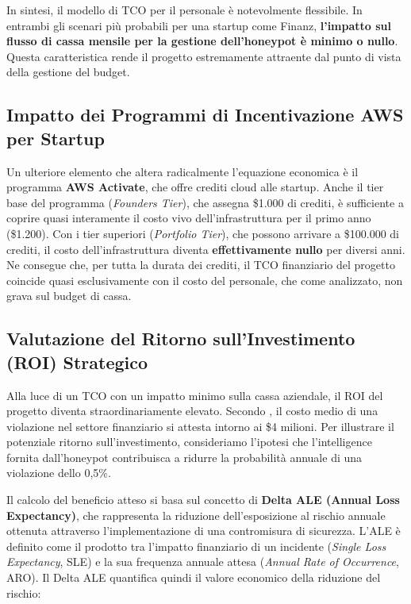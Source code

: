 In sintesi, il modello di TCO per il personale è notevolmente flessibile. In entrambi gli scenari più probabili per una startup come Finanz, \textbf{l'impatto sul flusso di cassa mensile per la gestione dell'honeypot è minimo o nullo}. Questa caratteristica rende il progetto estremamente attraente dal punto di vista della gestione del budget.

\subsection{Impatto dei Programmi di Incentivazione AWS per Startup}
Un ulteriore elemento che altera radicalmente l'equazione economica è il programma \textbf{AWS Activate}, che offre crediti cloud alle startup. Anche il tier base del programma (\textit{Founders Tier}), che assegna \$1.000 di crediti, è sufficiente a coprire quasi interamente il costo vivo dell'infrastruttura per il primo anno (\$1.200). Con i tier superiori (\textit{Portfolio Tier}), che possono arrivare a \$100.000 di crediti, il costo dell'infrastruttura diventa \textbf{effettivamente nullo} per diversi anni.
Ne consegue che, per tutta la durata dei crediti, il TCO finanziario del progetto coincide quasi esclusivamente con il costo del personale, che come analizzato, non grava sul budget di cassa.

\subsection{Valutazione del Ritorno sull'Investimento (ROI) Strategico}
Alla luce di un TCO con un impatto minimo sulla cassa aziendale, il ROI del progetto diventa straordinariamente elevato. Secondo \cite{dataBreachCosts,arquelau_luiz_vergara_robson_amvame_2024}, il costo medio di una violazione nel settore finanziario si attesta intorno ai \$4 milioni. Per illustrare il potenziale ritorno sull'investimento, consideriamo l'ipotesi che l'intelligence fornita dall'honeypot contribuisca a ridurre la probabilità annuale di una violazione dello 0,5\%. 

Il calcolo del beneficio atteso si basa sul concetto di \textbf{Delta ALE (Annual Loss Expectancy)}, che rappresenta la riduzione dell'esposizione al rischio annuale ottenuta attraverso l'implementazione di una contromisura di sicurezza. L'ALE è definito come il prodotto tra l'impatto finanziario di un incidente (\textit{Single Loss Expectancy}, SLE) e la sua frequenza annuale attesa (\textit{Annual Rate of Occurrence}, ARO). Il Delta ALE quantifica quindi il valore economico della riduzione del rischio:


